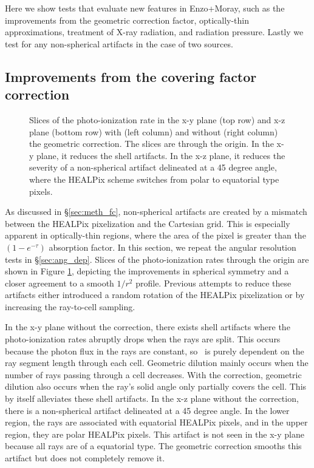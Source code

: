 \documentclass[apj,onecolumn]{emulateapj}
\begin{document}
Here we show tests that evaluate new features in Enzo+Moray, such as
the improvements from the geometric correction factor, optically-thin
approximations, treatment of X-ray radiation, and radiation pressure.
Lastly we test for any non-spherical artifacts in the case of two
sources.

\subsection{Improvements from the covering factor correction}
\label{sec:test_fc}

\begin{figure}[t]
  \caption{\label{fig:fc_slices} Slices of the photo-ionization rate
    in the x-y plane (top row) and x-z plane (bottom row) with (left
    column) and without (right column) the geometric correction.  The
    slices are through the origin.  In the x-y plane, it reduces the
    shell artifacts.  In the x-z plane, it reduces the severity of a
    non-spherical artifact delineated at a 45 degree angle, where the
    HEALPix scheme switches from polar to equatorial type pixels.}
\end{figure}

As discussed in \S\ref{sec:meth_fc}, non-spherical artifacts are
created by a mismatch between the HEALPix pixelization and the
Cartesian grid.  This is especially apparent in optically-thin
regions, where the area of the pixel is greater than the
$(1-e^{-\tau})$ absorption factor.  In this section, we repeat the
angular resolution tests in \S\ref{sec:ang_dep}.  Slices of the
photo-ionization rates through the origin are shown in Figure
\ref{fig:fc_slices}, depicting the improvements in spherical symmetry
and a closer agreement to a smooth $1/r^2$ profile.  Previous attempts
to reduce these artifacts either introduced a random rotation of the
HEALPix pixelization \citep[e.g.][]{Abel02_RT, Trac07, Krumholz07_ART}
or by increasing the ray-to-cell sampling.

In the x-y plane without the correction, there exists shell artifacts
where the photo-ionization rates abruptly drops when the rays are
split.  This occurs because the photon flux in the rays are constant,
so \kph~is purely dependent on the ray segment length through each
cell.  Geometric dilution mainly occurs when the number of rays
passing through a cell decreases.  With the correction, geometric
dilution also occurs when the ray's solid angle only partially covers
the cell.  This by itself alleviates these shell artifacts.  In the
x-z plane without the correction, there is a non-spherical artifact
delineated at a 45 degree angle.  In the lower region, the rays are
associated with equatorial HEALPix pixels, and in the upper region,
they are polar HEALPix pixels.  This artifact is not seen in the x-y
plane because all rays are of a equatorial type.  The geometric
correction smooths this artifact but does not completely remove it.
\end{document}
